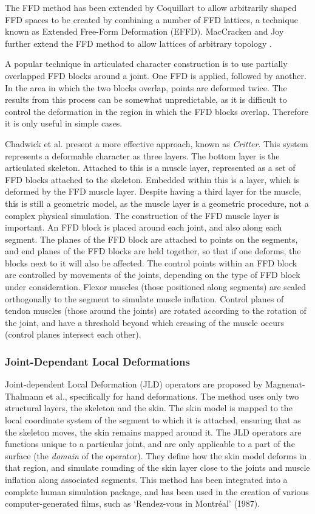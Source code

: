 \documentclass[10pt,oneside,fleqn,a4paper]{book}
\begin{document}
The FFD method has been extended by Coquillart \cite{Coquillart90} to allow arbitrarily shaped FFD spaces to be created by combining a number of FFD lattices, a technique known as Extended Free-Form Deformation (EFFD). MacCracken and Joy further extend the FFD method to allow lattices of arbitrary topology \cite{MacCracken96}.

A popular technique in articulated character construction is to use partially overlapped FFD blocks around a joint. One FFD is applied, followed by another. In the area in which the two blocks overlap, points are deformed twice. The results from this process can be somewhat unpredictable, as it is difficult to control the deformation in the region in which the FFD blocks overlap. Therefore it is only useful in simple cases.

Chadwick et al. \cite{Chadwick89} present a more effective approach, known as {\it Critter}. This system represents a deformable character as three layers. The bottom layer is the articulated skeleton. Attached to this is a muscle layer, represented as a set of FFD blocks attached to the skeleton. Embedded within this is a layer, which is deformed by the FFD muscle layer. Despite having a third layer for the muscle, this is still a geometric model, as the muscle layer is a geometric procedure, not a complex physical simulation. The construction of the FFD muscle layer is important.  An FFD block is placed around each joint, and also along each segment. The planes of the FFD block are attached to points on the segments, and end planes of the FFD blocks are held together, so that if one deforms, the blocks next to it will also be affected. The control points within an FFD block are controlled by movements of the joints, depending on the type of FFD block under consideration. Flexor muscles (those positioned along segments) are scaled orthogonally to the segment to simulate muscle inflation. Control planes of tendon muscles (those around the joints) are rotated according to the rotation of the joint, and have a threshold beyond which creasing of the muscle occurs (control planes intersect each other).

\subsubsection{Joint-Dependant Local Deformations}
Joint-dependent Local Deformation (JLD) operators are proposed by Magnenat-Thalmann et al.\cite{Magnenat-Thalmann88}, specifically for hand deformations. The method uses only two structural layers, the skeleton and the skin. The skin model is mapped to the local coordinate system of the segment to which it is attached, ensuring that as the skeleton moves, the skin remains mapped around it. The JLD operators are functions unique to a particular joint, and are only applicable to a part of the surface (the {\it domain} of the operator). They define how the skin model deforms in that region, and simulate rounding of the skin layer close to the joints and muscle inflation along associated segments. This method has been integrated into a complete human simulation package, and has been used in the creation of various computer-generated films, such as `Rendez-vous in Montr\'{e}al' (1987).
\end{document}
